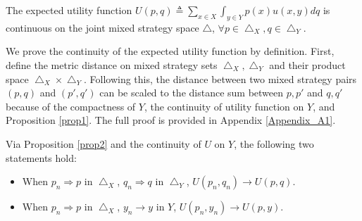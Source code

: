 \begin{proposition} \label{prop2} {}
    The expected utility function $U(p,q) \triangleq \sum_{x\in X}\int_{y\in Y} p(x)u(x,y)dq$ is continuous on the joint mixed strategy space $\bigtriangleup$, $\forall p \in \bigtriangleup_X, q \in \bigtriangleup_Y$.
\end{proposition}
\begin{proof-sketch}
    We prove the continuity of the expected utility function by definition. First, define the metric distance on mixed strategy sets $\bigtriangleup_{X}, \bigtriangleup_{Y}$ and their product space $\bigtriangleup_{X} \times \bigtriangleup_{Y}$. Following this, the distance between two mixed strategy pairs $(p, q)$ and $(p', q')$ can be scaled to the distance sum between $p, p'$ and $q, q'$ because of the compactness of $Y$, the continuity of utility function on $Y$, and Proposition \ref{prop1}. The full proof is provided in Appendix \ref{Appendix_A1}.
\end{proof-sketch}

Via Proposition \ref{prop2} and the continuity of $U$ on $Y$, the following two statements hold:
\begin{itemize}
    \item When $p_n \Rightarrow p$ in $\bigtriangleup_X$, $q_n \Rightarrow q$ in $\bigtriangleup_Y$, $U(p_n, q_n) \rightarrow U(p, q).$
    \item When $p_n \Rightarrow p$ in $\bigtriangleup_X$, $y_n \rightarrow y$ in $Y$, $U(p_n, y_n) \rightarrow U(p, y).$
\end{itemize}


